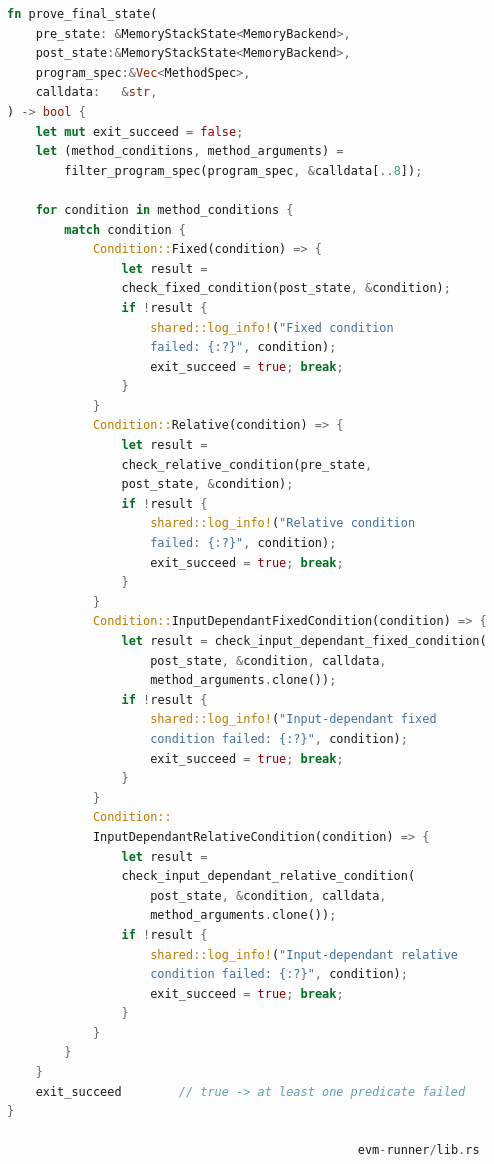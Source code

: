 \begin{lstlisting}[caption={[Evaluating post-state predicates verbatim]},
                   label={lst:prove_final},
                   language=Rust]
fn prove_final_state(
    pre_state: &MemoryStackState<MemoryBackend>,
    post_state:&MemoryStackState<MemoryBackend>,
    program_spec:&Vec<MethodSpec>,
    calldata:   &str,
) -> bool {
    let mut exit_succeed = false;
    let (method_conditions, method_arguments) =
        filter_program_spec(program_spec, &calldata[..8]);

    for condition in method_conditions {
        match condition {
            Condition::Fixed(condition) => {
                let result = 
                check_fixed_condition(post_state, &condition);
                if !result {
                    shared::log_info!("Fixed condition 
                    failed: {:?}", condition);
                    exit_succeed = true; break;
                }
            }
            Condition::Relative(condition) => {
                let result = 
                check_relative_condition(pre_state, 
                post_state, &condition);
                if !result {
                    shared::log_info!("Relative condition 
                    failed: {:?}", condition);
                    exit_succeed = true; break;
                }
            }
            Condition::InputDependantFixedCondition(condition) => {
                let result = check_input_dependant_fixed_condition(
                    post_state, &condition, calldata, 
                    method_arguments.clone());
                if !result {
                    shared::log_info!("Input-dependant fixed 
                    condition failed: {:?}", condition);
                    exit_succeed = true; break;
                }
            }
            Condition::
            InputDependantRelativeCondition(condition) => {
                let result = 
                check_input_dependant_relative_condition(
                    post_state, &condition, calldata,
                    method_arguments.clone());
                if !result {
                    shared::log_info!("Input-dependant relative
                    condition failed: {:?}", condition);
                    exit_succeed = true; break;
                }
            }
        }
    }
    exit_succeed        // true -> at least one predicate failed
}

                                                 evm-runner/lib.rs
\end{lstlisting}


